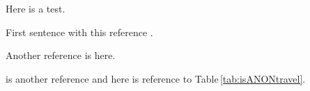 \documentclass{CORE-AAS/aastex631}
\begin{document}
Here is a test. 

First sentence with this reference \citep{biviano+2021aap650_105}. 

Another reference is \citep{bressan+1994apj94_63} here.

\citet{anantharamaiah+1996apj466_13} is another reference and here is reference to Table\,\ref{tab:isANONtravel}.





%
%
%
\end{document}
